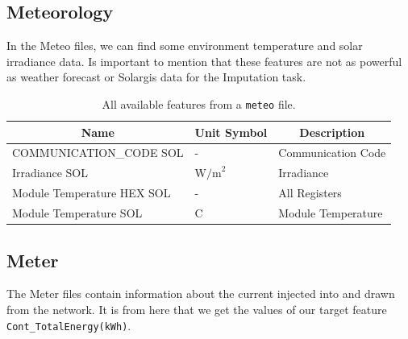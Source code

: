\subsection{Meteorology}
In the Meteo files, we can find some environment
temperature and solar irradiance data. Is important to mention that these
features are not as powerful as
weather forecast or Solargis data for the Imputation task.


\begin{table}[H]
	\begin{center}
		\begin{tabular}[c]{l|l|l}
			\multicolumn{1}{c|}{\textbf{Name}}        &
			\multicolumn{1}{c|}{\textbf{Unit Symbol}} &
			\multicolumn{1}{c}{\textbf{Description}}                                        \\
			\hline
			COMMUNICATION\_CODE SOL                   & -              & Communication Code \\
			Irradiance SOL                            & $\text{W/m}^2$ & Irradiance         \\
			Module Temperature HEX SOL                & -              & All Registers      \\
			Module Temperature SOL                    & C              & Module Temperature \\
		\end{tabular}
		\caption{All available features from a \texttt{meteo} file.}\label{tab:solargisfeatures}
	\end{center}
\end{table}

\subsection{Meter}
The Meter files contain information about the current injected
into and drawn from the network. It is from here that we get
the values of our target feature \verb|Cont_TotalEnergy(kWh)|.


